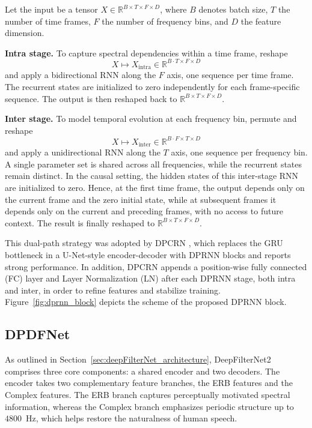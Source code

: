 \documentclass[final,5p,times,authoryear]{elsarticle}
\begin{document}
Let the input be a tensor $X \in \mathbb{R}^{B \times T \times F \times D}$, where $B$ denotes batch size, $T$ the number of time frames, $F$ the number of frequency bins, and $D$ the feature dimension.  

\textbf{Intra stage.} To capture spectral dependencies within a time frame, reshape
\[
X \mapsto X_{\text{intra}} \in \mathbb{R}^{B \cdot T \times F \times D}
\]
and apply a bidirectional RNN along the $F$ axis, one sequence per time frame. The recurrent states are initialized to zero independently for each frame-specific sequence. The output is then reshaped back to \(\mathbb{R}^{B \times T \times F \times D}\).

\textbf{Inter stage.} To model temporal evolution at each frequency bin, permute and reshape
\[
X \mapsto X_{\text{inter}} \in \mathbb{R}^{B \cdot F \times T \times D}
\]
and apply a unidirectional RNN along the $T$ axis, one sequence per frequency bin. A single parameter set is shared across all frequencies, while the recurrent states remain distinct. In the causal setting, the hidden states of this inter-stage RNN are initialized to zero. Hence, at the first time frame, the output depends only on the current frame and the zero initial state, while at subsequent frames it depends only on the current and preceding frames, with no access to future context. The result is finally reshaped to \(\mathbb{R}^{B \times T \times F \times D}\).

This dual-path strategy was adopted by DPCRN \citep{DPCRN}, which replaces the GRU bottleneck in a U-Net-style encoder-decoder with DPRNN blocks and reports strong performance. In addition, DPCRN appends a position-wise fully connected (FC) layer and Layer Normalization (LN) \citep{layer_normalization} after each DPRNN stage, both intra and inter, in order to refine features and stabilize training. Figure~\ref{fig:dprnn_block} depicts the scheme of the proposed DPRNN block.


\subsection{DPDFNet}
As outlined in Section~\ref{sec:deepFilterNet_architecture}, DeepFilterNet2 comprises three core components: a shared encoder and two decoders. The encoder takes two complementary feature branches, the ERB features and the Complex features. The ERB branch captures perceptually motivated spectral information, whereas the Complex branch emphasizes periodic structure up to $4800$~Hz, which helps restore the naturalness of human speech.
\end{document}
